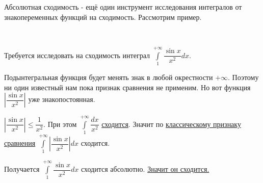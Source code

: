 \documentclass[../main.tex]{subfiles}
\begin{document}
Абсолютная сходимость - ещё один инструмент исследования интегралов от знакопеременных функций на сходимость. Рассмотрим пример. 

\begin{example}
    
    ~

    Требуется исследовать на сходимость интеграл \( \displaystyle\int\limits_{ 1}^{ + \infty } \dfrac{ \sin x}{ x^2} dx\). 
    
    Подынтегральная функция будет менять знак в любой окрестности \( + \infty \). Поэтому ни один известный нам пока признак сравнения не применим. Но вот функция \( \left| \dfrac{ \sin x}{ x^2} \right|\) уже знакопостоянная. 

    \( \left| \dfrac{ \sin x}{ x^2} \right| \leq \dfrac{ 1}{ x^2} \). При этом \( \displaystyle\int\limits_{ 1}^{ + \infty } \dfrac{ dx}{ x^2} \) \hyperlink{ex:converge}{сходится}. Значит по \hyperlink{thm:converge_classic}{классическому признаку сравнения} \( \displaystyle\int\limits_{ 1}^{ + \infty } \left| \dfrac{ \sin x}{ x^2} \right|dx\) сходится. 

    Получается \( \displaystyle\int\limits_{ 1}^{ + \infty} \dfrac{ \sin x}{ x^2} dx\) сходится абсолютно. \hyperlink{thm:converge_abs}{Значит он сходится.}
\end{example}
\end{document}
